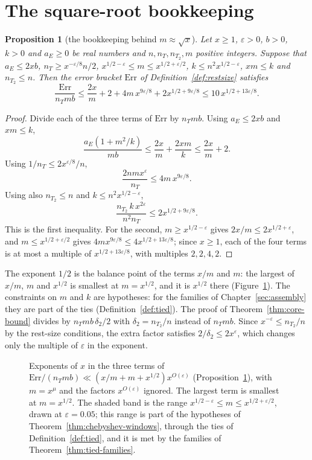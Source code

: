 \documentclass[11pt]{amsbook}
\theoremstyle{plain}
\newtheorem{proposition}[theorem]{Proposition}
\theoremstyle{definition}
\theoremstyle{remark}
\numberwithin{equation}{section}
\numberwithin{figure}{chapter}
\numberwithin{table}{chapter}
\newcommand{\eps}{\varepsilon}
\newcommand{\Err}{\mathrm{Err}}
\begin{document}
\section{The square-root bookkeeping}

\begin{proposition}[the bookkeeping behind $m\approx\sqrt x$]
\label{prop:sqrtx}
Let $x\ge1$, $\eps>0$, $b>0$, $k>0$ and $a_E\ge0$ be real numbers and
$n,n_T,n_{T_2},m$ positive integers. Suppose that $a_E\le2xb$,
$n_T\ge x^{-\eps/8}n/2$, $x^{1/2-\eps}\le m\le x^{1/2+\eps/2}$,
$k\le n^2x^{1/2-\eps}$, $xm\le k$ and $n_{T_2}\le n$. Then the error
bracket $\Err$ of Definition~\ref{def:restsize} satisfies
\[
\frac{\Err}{n_Tmb}\le\frac{2x}m+2+4m\,x^{9\eps/8}+2x^{1/2+9\eps/8}
\le10\,x^{1/2+13\eps/8}.
\]
\end{proposition}

\begin{proof}
Divide each of the three terms of $\Err$ by $n_Tmb$. Using
$a_E\le2xb$ and $xm\le k$,
\[
\frac{a_E(1+m^2/k)}{mb}\le\frac{2x}m+\frac{2xm}k\le\frac{2x}m+2.
\]
Using $1/n_T\le2x^{\eps/8}/n$,
\[
\frac{2nmx^\eps}{n_T}\le4m\,x^{9\eps/8}.
\]
Using also $n_{T_2}\le n$ and $k\le n^2x^{1/2-\eps}$,
\[
\frac{n_{T_2}\,k\,x^{2\eps}}{n^2n_T}\le2x^{1/2+9\eps/8}.
\]
This is the first inequality. For the second, $m\ge x^{1/2-\eps}$
gives $2x/m\le2x^{1/2+\eps}$, and $m\le x^{1/2+\eps/2}$ gives
$4mx^{9\eps/8}\le4x^{1/2+13\eps/8}$; since $x\ge1$, each of the four
terms is at most a multiple of $x^{1/2+13\eps/8}$, with multiples
$2,2,4,2$.
\end{proof}

\noindent The exponent $1/2$ is the balance point of the terms $x/m$
and $m$: the largest of $x/m$, $m$ and $x^{1/2}$ is smallest at
$m=x^{1/2}$, and it is $x^{1/2}$ there (Figure~\ref{fig:exponents}). The
constraints on $m$ and $k$
are hypotheses: for the families of Chapter~\ref{sec:assembly} they
are part of the ties (Definition~\ref{def:tied}). The proof of
Theorem~\ref{thm:core-bound} divides by $n_Tmb\,\delta_2/2$ with
$\delta_2=n_{T_2}/n$ instead of $n_Tmb$. Since $x^{-\eps}\le
n_{T_2}/n$ by the rest-size conditions, the extra factor satisfies
$2/\delta_2\le2x^\eps$, which changes only the multiple of $\eps$ in
the exponent.

\begin{figure}[htbp]
\centering

\caption{Exponents of $x$ in the three terms of
$\Err/(n_Tmb)\ll(x/m+m+x^{1/2})x^{O(\eps)}$
(Proposition~\ref{prop:sqrtx}), with $m=x^\mu$ and the factors
$x^{O(\eps)}$ ignored. The largest term is smallest at $m=x^{1/2}$.
The shaded band is the range $x^{1/2-\eps}\le m\le x^{1/2+\eps/2}$,
drawn at $\eps=0.05$; this range is part of the hypotheses of
Theorem~\ref{thm:chebyshev-windows}, through the ties of
Definition~\ref{def:tied}, and it is met by the families of
Theorem~\ref{thm:tied-families}.}
\label{fig:exponents}
\end{figure}
\end{document}
